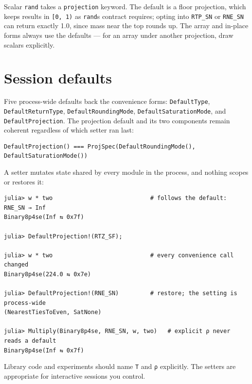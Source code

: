 Scalar \texttt{rand} takes a \texttt{projection} keyword. The default is a floor projection, which keeps results in \texttt{[0, 1)} as \texttt{rand}{\textquotesingle}s contract requires; opting into \texttt{RTP\_\allowbreak{}SN} or \texttt{RNE\_\allowbreak{}SN} can return exactly 1.0, since mass near the top rounds up. The array and in-place forms always use the defaults — for an array under another projection, draw scalars explicitly.



\section{Session defaults}



\label{3970345369238056532}{}


Five process-wide defaults back the convenience forms: \texttt{DefaultType}, \texttt{DefaultReturnType}, \texttt{DefaultRoundingMode}, \texttt{DefaultSaturationMode}, and \texttt{DefaultProjection}. The projection default and its two components remain coherent regardless of which setter ran last:




\nopagebreak[4]
\begin{verbatim}
DefaultProjection() === ProjSpec(DefaultRoundingMode(), DefaultSaturationMode())
\end{verbatim}



A setter mutates state shared by every module in the process, and nothing scopes or restores it:




\nopagebreak[4]
\begin{verbatim}
julia> w * two                            # follows the default: RNE_SN → Inf
Binary8p4se(Inf ⇆ 0x7f)

julia> DefaultProjection!(RTZ_SF);

julia> w * two                            # every convenience call changed
Binary8p4se(224.0 ⇆ 0x7e)

julia> DefaultProjection!(RNE_SN)         # restore; the setting is process-wide
(NearestTiesToEven, SatNone)

julia> Multiply(Binary8p4se, RNE_SN, w, two)   # explicit ρ never reads a default
Binary8p4se(Inf ⇆ 0x7f)
\end{verbatim}



Library code and experiments should name \texttt{T} and \texttt{ρ} explicitly. The setters are appropriate for interactive sessions you control.



